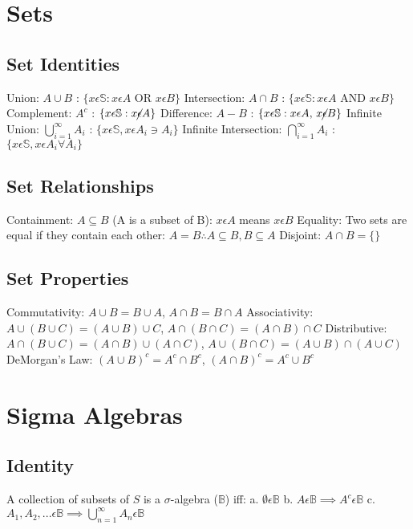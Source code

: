 \documentclass[twocolumn]{article}
\let\Oldbigcup=\bigcup
\let\Oldbigcap=\bigcap
\renewcommand{\bigcup}{\Oldbigcup\limits}
\renewcommand{\bigcap}{\Oldbigcap\limits}
\begin{document}
\obeylines

\section*{Sets}

\subsection*{Set Identities}

Union: $A \cup B$ : $\{x \epsilon \mathbb{S} : x \epsilon A \text{ OR } x \epsilon B\}$
Intersection: $A \cap B$ : $\{x \epsilon \mathbb{S} : x \epsilon A \text{ AND } x \epsilon B\}$
Complement: $A^c$ : $\{x \epsilon \mathbb{S} : x \cancel{\epsilon} A\}$
Difference: $A - B$ : $\{x \epsilon \mathbb{S} : x \epsilon A \text{, } x \cancel{\epsilon} B\}$
Infinite Union: $\bigcup_{i=1}^{\infty} A_i$ : $\{x \epsilon \mathbb{S}, x \epsilon A_i \ni A_i\}$
Infinite Intersection: $\bigcap_{i=1}^{\infty} A_i$ : $\{x \epsilon \mathbb{S}, x \epsilon A_i \forall A_i\}$

\subsection*{Set Relationships}
Containment: $ A \subseteq B$ (A is a subset of B): $x \epsilon A$ means $x \epsilon B$
Equality: Two sets are equal if they contain each other: $A = B \therefore A \subseteq B, B \subseteq A$
Disjoint: $ A \cap B = \{\}$

\subsection*{Set Properties}
Commutativity: $A \cup B = B \cup A$, $A \cap B = B \cap A$
Associativity: $A \cup (B \cup C) = (A \cup B) \cup C$, $A \cap (B \cap C) = (A \cap B) \cap C$
Distributive: $A \cap (B \cup C) = (A \cap B) \cup (A \cap C)$, $A \cup (B \cap C) = (A \cup B) \cap (A \cup C)$
DeMorgan's Law: $(A \cup B)^c = A^c \cap B^c$, $(A \cap B)^c = A^c \cup B^c$

\section*{Sigma Algebras}

\subsection*{Identity}
A collection of subsets of $S$ is a $\sigma$-algebra ($\mathbb{B}$) iff: 
a. $\emptyset \epsilon \mathbb{B}$
b. $A \epsilon \mathbb{B} \implies A^c \epsilon \mathbb{B}$
c. $A_1, A_2, ... \epsilon \mathbb{B} \implies \bigcup_{n=1}^{\infty} A_n \epsilon \mathbb{B}$
\end{document}

